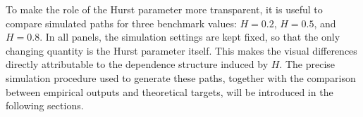 \documentclass[a4paper,10pt,titlepage,oneside,openany]{book}
\theoremstyle{plain}
\theoremstyle{definition}
\theoremstyle{remark}
\newcommand{\1}{\mathbf{1}}
\begin{document}
To make the role of the Hurst parameter more transparent, it is useful to compare simulated paths for three benchmark values: \(H=0.2\), \(H=0.5\), and \(H=0.8\). In all panels, the simulation settings are kept fixed, so that the only changing quantity is the Hurst parameter itself. This makes the visual differences directly attributable to the dependence structure induced by \(H\). The precise simulation procedure used to generate these paths, together with the comparison between empirical outputs and theoretical targets, will be introduced in the following sections.

\begin{algorithm}[H]
\caption{Reading the fractional Brownian motion path comparison}
\DontPrintSemicolon
{}
\end{algorithm}

\clearpage
\end{document}
